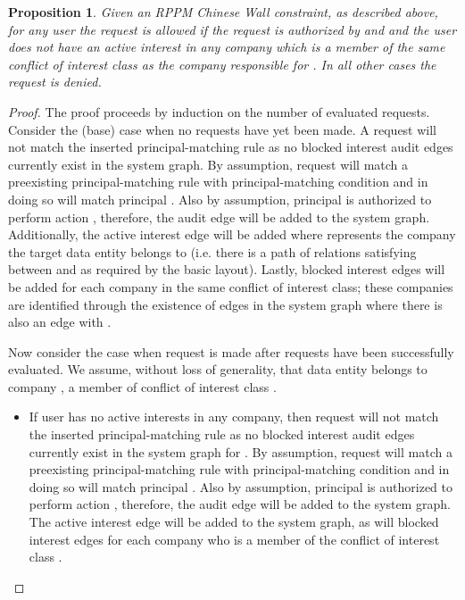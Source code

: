 \documentclass{article}
\newtheorem{proposition}{Proposition}
\begin{document}
\begin{proposition}\label{prop:chinese-wall}
    Given an RPPM Chinese Wall constraint, as described above, for any user  the request  is allowed if the request is authorized by  and  and the user  does not have an active interest in any company  which is a member of the same conflict of interest class as the company  responsible for .
    In all other cases the request is denied.
\end{proposition}

\begin{proof}
    The proof proceeds by induction on the number of evaluated requests.
    Consider the (base) case when no requests have yet been made.
    A request  will not match the inserted principal-matching rule  as no blocked interest audit edges currently exist in the system graph.
    By assumption, request  will match a preexisting principal-matching rule with principal-matching condition  and in doing so will match principal .
    Also by assumption, principal  is authorized to perform action , therefore, the audit edge  will be added to the system graph.
    Additionally, the active interest edge  will be added where  represents the company the target data entity  belongs to (i.e. there is a path of relations satisfying  between  and  as required by the basic layout).
    Lastly, blocked interest edges  will be added for each company  in the same conflict of interest class; these companies are identified through the existence of edges  in the system graph where there is also an edge  with .

    Now consider the case when request  is made after  requests have been successfully evaluated.
    We assume, without loss of generality, that data entity  belongs to company , a member of conflict of interest class .
    \begin{itemize}
        \item If user  has no active interests in any company, then request  will not match the inserted principal-matching rule  as no blocked interest audit edges currently exist in the system graph for .
            By assumption, request  will match a preexisting principal-matching rule with principal-matching condition  and in doing so will match principal .
            Also by assumption, principal  is authorized to perform action , therefore, the audit edge  will be added to the system graph.
            The active interest edge  will be added to the system graph, as will blocked interest edges  for each company  who is a member of the conflict of interest class .


\end{itemize}
\end{proof}
\end{document}
